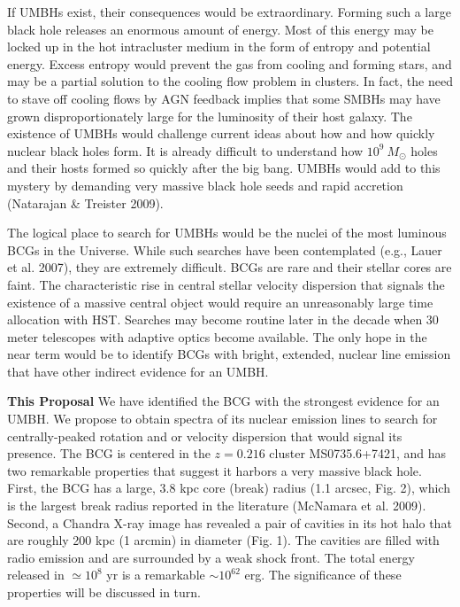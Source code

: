 \documentclass[12pt]{article}
\begin{document}
If UMBHs exist, their consequences would be extraordinary.   Forming such a large black hole releases an enormous amount of energy.  Most of this energy may be locked up in the
hot intracluster medium in the form of entropy and potential energy.  Excess entropy would
prevent the gas from cooling and forming stars, and may be a partial solution
to the cooling flow problem in clusters.  In fact, the need to stave off cooling flows by AGN feedback implies that some
SMBHs may have grown disproportionately large for the luminosity of their host galaxy.  The existence of
UMBHs would challenge current ideas about how and how quickly nuclear black holes form.   It is already difficult to understand how $10^9~M_\odot$ holes and their hosts formed so quickly after the big bang.  UMBHs would
add to this mystery by demanding very massive black hole seeds and rapid accretion (Natarajan \& Treister 2009).


The logical place to search for UMBHs would be the nuclei of the most luminous BCGs in the Universe.  While such searches have been contemplated (e.g., Lauer et al. 2007), they are extremely difficult. BCGs are rare  and their stellar cores are faint.  The characteristic rise in central stellar velocity dispersion that signals the existence of
a massive central object would require an unreasonably large time allocation with HST.  Searches may become routine later in the decade when 30 meter telescopes with adaptive optics become available.  The only hope in the near term would be to identify BCGs with bright, extended, nuclear line emission that have other indirect evidence for an UMBH.  

{\bf This Proposal} We have identified the BCG with the strongest evidence for an UMBH.   We propose to obtain spectra of its nuclear emission lines to search for centrally-peaked rotation and or velocity dispersion that would
signal its presence.  The BCG is centered in the $z=0.216$ cluster MS0735.6+7421, and has two remarkable properties that suggest it harbors a very massive black hole. First, the BCG has a large, $3.8$ kpc core (break) radius (1.1 arcsec, Fig. 2), which is the largest  break radius reported in the literature (McNamara et al. 2009).  Second, a Chandra X-ray image has revealed a pair of cavities in its hot halo that are roughly 200 kpc (1 arcmin) in diameter (Fig. 1).  The cavities are filled with radio emission and are surrounded by a weak shock front.  The total energy released in $\simeq 10^8$ yr is a remarkable $\sim 10^{62}$ erg.   
The significance of these properties will be discussed in turn. 
\end{document}
